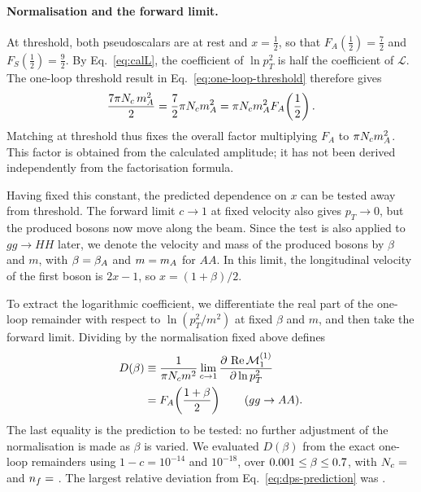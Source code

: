 \paragraph{Normalisation and the forward limit.}

At threshold, both pseudoscalars are at rest
and $x=\tfrac12$, so that
$F_A(\tfrac12)=\tfrac72$ and
$F_S(\tfrac12)=\tfrac92$.
By Eq.~\eqref{eq:calL}, the coefficient of
$\ln p_T^2$ is half the coefficient of
$\mathcal L$. The one-loop threshold result
in Eq.~\eqref{eq:one-loop-threshold}
therefore gives
\[
 \frac{7\pi N_c\,m_A^2}{2}
 =\frac72\pi N_cm_A^2
 =\pi N_cm_A^2F_A\!\left(\frac12\right).
\]
Matching at threshold thus fixes the overall
factor multiplying $F_A$ to $\pi N_cm_A^2$.
This factor is obtained from the calculated
amplitude; it has not been derived independently
from the factorisation formula.

Having fixed this constant, the predicted
dependence on $x$ can be tested away from
threshold. The forward limit $c\to1$ at
fixed velocity also gives $p_T\to0$, but the
produced bosons now move along the beam.
Since the test is also applied to $gg\to HH$ later, we denote the velocity and mass of the produced bosons by $\beta$ and $m$, with $\beta=\beta_A$ and $m=m_A$ for $AA$.
In this limit, the longitudinal velocity of
the first boson is $2x-1$, so
$x=(1+\beta)/2$.

To extract the logarithmic coefficient, we differentiate the real part
of the one-loop remainder with respect to $\ln(p_T^2/m^2)$ at fixed
$\beta$ and $m$, and then take the forward limit.
Dividing by the normalisation fixed above defines
\begin{align}
 D(\beta)
 &\equiv
 \frac{1}{\pi N_c m^2}
 \lim_{c\to1}
 \frac{\partial\,\operatorname{Re}\mathcal M_1^{(1)}}
      {\partial\ln p_T^2}
 \nonumber\\
 &=F_A\!\left(\frac{1+\beta}{2}\right)
 \qquad (gg\to AA).
 \label{eq:dps-prediction}
\end{align}
The last equality is the prediction to be
tested: no further adjustment of the
normalisation is made as $\beta$ is varied.
We evaluated $D(\beta)$ from the exact one-loop
remainders using $1-c=10^{-14}$ and
$10^{-18}$, over
$0.001\leq\beta\leq0.7$,
with $N_c=$ \DPSNcValues{} and
$n_f=$ \DPSNfValues{}.
The largest relative deviation from
Eq.~\eqref{eq:dps-prediction} was
\DPSMaxDeviation{}.


